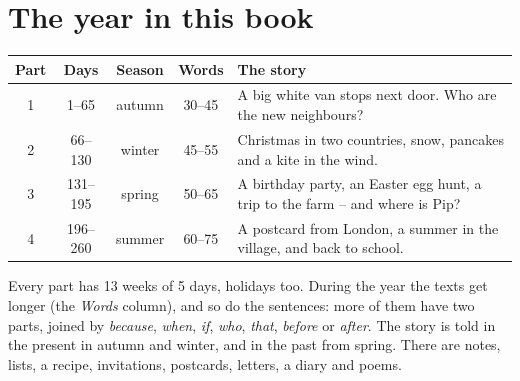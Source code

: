 \section*{The year in this book}

\begin{center}
\renewcommand{\arraystretch}{1.4}
\begin{tabularx}{\linewidth}{@{}c c c c X@{}}
\toprule
\textbf{Part} & \textbf{Days} & \textbf{Season} & \textbf{Words} & \textbf{The story} \\
\midrule
1 & 1--65    & autumn & 30--45 & A big white van stops next door. Who are the new
neighbours? \\
2 & 66--130  & winter & 45--55 & Christmas in two countries, snow, pancakes and a
kite in the wind. \\
3 & 131--195 & spring & 50--65 & A birthday party, an Easter egg hunt, a trip to the
farm -- and where is Pip? \\
4 & 196--260 & summer & 60--75 & A postcard from London, a summer in the village,
and back to school. \\
\bottomrule
\end{tabularx}
\end{center}

\vspace{6mm}
Every part has 13 weeks of 5 days, holidays too. During the year the
texts get longer (the \textit{Words} column), and so do the sentences:
more of them have two parts, joined by \textit{because}, \textit{when},
\textit{if}, \textit{who}, \textit{that}, \textit{before} or
\textit{after}. The story is told in the present in autumn and winter,
and in the past from spring. There are notes, lists, a recipe,
invitations, postcards, letters, a diary and poems.
\newpage
